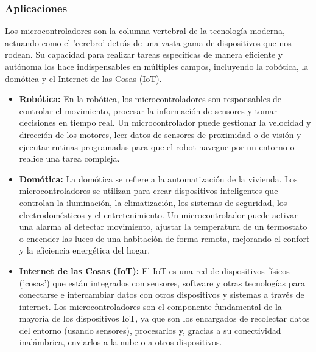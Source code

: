 \documentclass[a4paper,12pt]{article}
\begin{document}
	\subsubsection{Aplicaciones}
	Los microcontroladores son la columna vertebral de la tecnología moderna, actuando como el 'cerebro' detrás de una vasta gama de dispositivos que nos rodean. Su capacidad para realizar tareas específicas de manera eficiente y autónoma los hace indispensables en múltiples campos, incluyendo la robótica, la domótica y el Internet de las Cosas (IoT).
	
	\begin{itemize}
		\item \textbf{Robótica:} En la robótica, los microcontroladores son responsables de controlar el movimiento, procesar la información de sensores y tomar decisiones en tiempo real. Un microcontrolador puede gestionar la velocidad y dirección de los motores, leer datos de sensores de proximidad o de visión y ejecutar rutinas programadas para que el robot navegue por un entorno o realice una tarea compleja.
		
		\item \textbf{Domótica:} La domótica se refiere a la automatización de la vivienda. Los microcontroladores se utilizan para crear dispositivos inteligentes que controlan la iluminación, la climatización, los sistemas de seguridad, los electrodomésticos y el entretenimiento. Un microcontrolador puede activar una alarma al detectar movimiento, ajustar la temperatura de un termostato o encender las luces de una habitación de forma remota, mejorando el confort y la eficiencia energética del hogar.
		
		\item \textbf{Internet de las Cosas (IoT):} El IoT es una red de dispositivos físicos ('cosas') que están integrados con sensores, software y otras tecnologías para conectarse e intercambiar datos con otros dispositivos y sistemas a través de internet. Los microcontroladores son el componente fundamental de la mayoría de los dispositivos IoT, ya que son los encargados de recolectar datos del entorno (usando sensores), procesarlos y, gracias a su conectividad inalámbrica, enviarlos a la nube o a otros dispositivos.
	\end{itemize}
	
\end{document}
